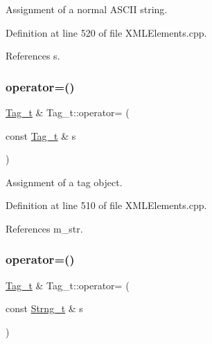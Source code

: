 Assignment of a normal A\+S\+C\+II string. 



Definition at line 520 of file X\+M\+L\+Elements.\+cpp.



References s.

\hypertarget{class_d_d4hep_1_1_x_m_l_1_1_tag__t_a1869e32e13504b08283ca87cfc1ad82a}{}\label{class_d_d4hep_1_1_x_m_l_1_1_tag__t_a1869e32e13504b08283ca87cfc1ad82a} 
\subsubsection{\texorpdfstring{operator=()}{operator=()}\hspace{0.1cm}{\footnotesize\ttfamily [2/4]}}
{\footnotesize\ttfamily \hyperlink{class_d_d4hep_1_1_x_m_l_1_1_tag__t}{Tag\+\_\+t} \& Tag\+\_\+t\+::operator= (\begin{DoxyParamCaption}\item[{const \hyperlink{class_d_d4hep_1_1_x_m_l_1_1_tag__t}{Tag\+\_\+t} \&}]{s }\end{DoxyParamCaption})}



Assignment of a tag object. 



Definition at line 510 of file X\+M\+L\+Elements.\+cpp.



References m\+\_\+str.

\hypertarget{class_d_d4hep_1_1_x_m_l_1_1_tag__t_af2111caa12315241c91c1414566aad0b}{}\label{class_d_d4hep_1_1_x_m_l_1_1_tag__t_af2111caa12315241c91c1414566aad0b} 
\subsubsection{\texorpdfstring{operator=()}{operator=()}\hspace{0.1cm}{\footnotesize\ttfamily [3/4]}}
{\footnotesize\ttfamily \hyperlink{class_d_d4hep_1_1_x_m_l_1_1_tag__t}{Tag\+\_\+t} \& Tag\+\_\+t\+::operator= (\begin{DoxyParamCaption}\item[{const \hyperlink{class_d_d4hep_1_1_x_m_l_1_1_strng__t}{Strng\+\_\+t} \&}]{s }\end{DoxyParamCaption})}



